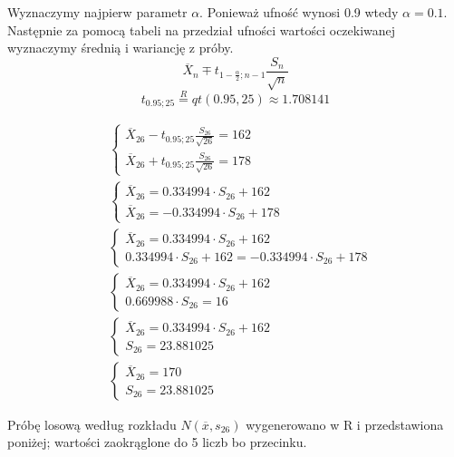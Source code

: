\documentclass{article}
\begin{document}
Wyznaczymy najpierw parametr $\alpha$. Ponieważ ufność wynosi 0.9 wtedy $\alpha = 0.1$. \\
Następnie za pomocą tabeli na przedział ufności wartości oczekiwanej wyznaczymy średnią i wariancję z próby.
\[ \overline{X}_n \mp t_{1-\frac{\alpha}{2};n-1} \frac{S_n}{\sqrt{n}} \]
\[ t_{0.95;25} \overset{R}{=} qt(0.95, 25) \approx 1.708141 \]

\begin{align*}
& \left\{ \begin{array}{c} \overline{X}_{26} - t_{0.95;25} \frac{S_{26}}{\sqrt{26}}  = 162\\
 \overline{X}_{26} + t_{0.95;25} \frac{S_{26}}{\sqrt{26}} = 178\end{array} \right. \\
& \left\{ \begin{array}{c} \overline{X}_{26} =  0.334994 \cdot S_{26} + 162\\
 \overline{X}_{26} = -0.334994 \cdot S_{26} + 178\end{array} \right. \\
& \left\{ \begin{array}{c} \overline{X}_{26} =  0.334994 \cdot S_{26} + 162\\
  0.334994 \cdot S_{26} + 162 = -0.334994 \cdot S_{26} + 178\end{array} \right. \\
& \left\{ \begin{array}{c} \overline{X}_{26} =  0.334994 \cdot S_{26} + 162\\
  0.669988 \cdot S_{26} = 16\end{array} \right. \\
& \left\{ \begin{array}{c} \overline{X}_{26} =  0.334994 \cdot S_{26} + 162\\
  S_{26} = 23.881025 \end{array} \right. \\
& \left\{ \begin{array}{c} \overline{X}_{26} = 170\\
  S_{26} = 23.881025 \end{array} \right.
\end{align*}

Próbę losową według rozkładu $N(\overline{x},s_{26})$ wygenerowano w R i przedstawiona poniżej; wartości zaokrąglone do 5 liczb bo przecinku.
\begin{center}
\end{center}
\end{document}
